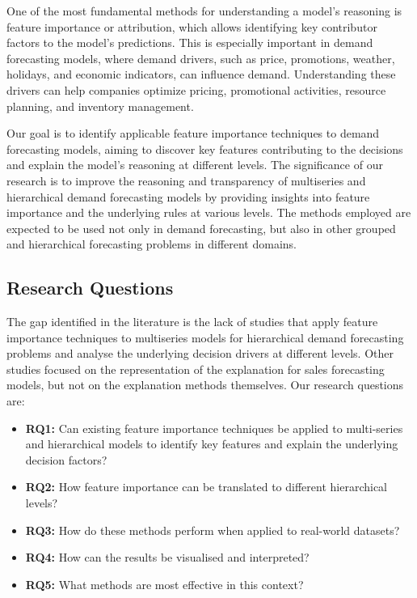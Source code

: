 One of the most fundamental methods for understanding a model's reasoning is feature importance or attribution, which allows identifying key contributor factors to the model's predictions.
This is especially important in demand forecasting models, where demand drivers, such as price, promotions, weather, holidays, and economic indicators, can influence demand.
Understanding these drivers can help companies optimize pricing, promotional activities, resource planning, and inventory management.

Our goal is to identify applicable feature importance techniques to demand forecasting models, aiming to discover key features contributing to the decisions and explain the model's reasoning at different levels.
The significance of our research is to improve the reasoning and transparency of multiseries and hierarchical demand forecasting models by providing insights into feature importance and the underlying rules at various levels.
The methods employed are expected to be used not only in demand forecasting, but also in other grouped and hierarchical forecasting problems in different domains.


\subsection{Research Questions}\label{sec:research_questions}

The gap identified in the literature is the lack of studies that apply feature importance techniques to multiseries models
for hierarchical demand forecasting problems and analyse the underlying decision drivers at different levels.
Other studies focused on the representation of the explanation for sales forecasting models, but not on the explanation methods themselves\cite{fahse2022explanation}.
Our research questions are:
\begin{itemize}
    \item \textbf{RQ1:} Can existing feature importance techniques be applied to multi-series and hierarchical models to identify key features and explain the underlying decision factors?
    \item \textbf{RQ2:} How feature importance can be translated to different hierarchical levels?
    \item \textbf{RQ3:} How do these methods perform when applied to real-world datasets?
    \item \textbf{RQ4:} How can the results be visualised and interpreted?
    \item \textbf{RQ5:} What methods are most effective in this context?
\end{itemize}

